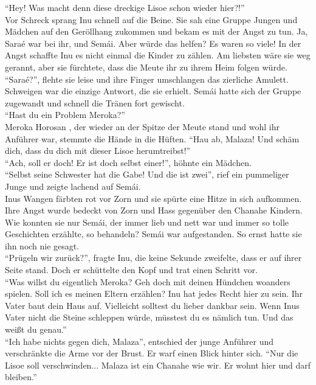 \documentclass[a4paper,12pt]{book}
\begin{document}
``Hey! Was macht denn diese dreckige Lisoe schon wieder hier?!'' \\
Vor Schreck sprang Inu schnell auf die Beine. Sie sah eine Gruppe Jungen und Mädchen auf den 
Geröllhang zukommen und bekam es mit der Angst zu tun. Ja, Saraé war bei ihr, und Semái. Aber würde 
das helfen? Es waren so viele! In der Angst schaffte Inu es nicht einmal die Kinder zu zählen. Am 
liebsten wäre sie weg gerannt, aber sie fürchtete, dass die Meute ihr zu ihrem Heim folgen würde. \\
``Saraé?'', flehte sie leise und ihre Finger umschlangen das zierliche Amulett. Schweigen war die 
einzige Antwort, die sie erhielt. Semái hatte sich der Gruppe zugewandt und schnell die Tränen fort 
gewischt. \\
``Hast du ein Problem Meroka?''\\
Meroka Horosan , der wieder an der Spitze der Meute stand und wohl ihr Anführer war, stemmte die 
Hände in die Hüften. ``Hau ab, Malaza! Und schäm dich, dass du dich mit dieser Lisoe 
herumtreibst!''\\
``Ach, soll er doch! Er ist doch selbst einer!'', höhnte ein Mädchen. \\
``Selbst seine Schwester hat die Gabe! Und die ist zwei'', rief ein pummeliger Junge und zeigte 
lachend auf Semái.\\
Inus Wangen färbten rot vor Zorn und sie spürte eine Hitze in sich aufkommen. Ihre Angst wurde 
bedeckt von Zorn und Hass gegenüber den Chanahe Kindern. Wie konnten sie nur Semái, der immer lieb 
und nett war und immer so tolle Geschichten erzählte, so behandeln? Semái war aufgestanden. So 
ernst hatte sie ihn noch nie gesagt.\\
``Prügeln wir zurück?'', fragte Inu, die keine Sekunde zweifelte, dass er auf ihrer Seite stand.
Doch er schüttelte den Kopf und trat einen Schritt vor.\\
``Was willst du eigentlich Meroka? Geh doch mit deinen Hündchen woanders spielen. Soll ich es 
meinen Eltern erzählen? Inu hat jedes Recht hier zu sein. Ihr Vater baut dein Haus auf. Vielleicht 
solltest du lieber dankbar sein. Wenn Inus Vater nicht die Steine schleppen würde, müsstest du es 
nämlich tun. Und das weißt du genau.''\\
``Ich habe nichts gegen dich, Malaza'', entschied der junge Anführer und verschränkte die Arme vor 
der Brust. Er warf einen Blick hinter sich. ``Nur die Lisoe soll verschwinden... Malaza ist ein 
Chanahe wie wir. Er wohnt hier und darf bleiben.''\\
\end{document}

